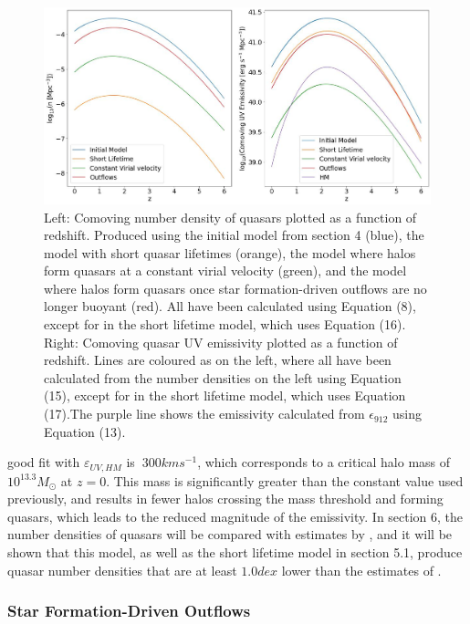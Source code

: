 \documentclass[12pt, twocolumn]{report}%
\begin{document}
\begin{figure}[H]
\centering
\includegraphics[width=\linewidth]{Plot_10.jpeg}
\caption{Left: Comoving number density of quasars plotted as a function of redshift. Produced using the initial model from section 4 (blue), the model with short quasar lifetimes (orange), the model where halos form quasars at a constant virial velocity (green), and the model where halos form quasars once star formation-driven outflows are no longer buoyant (red). All have been calculated using Equation (8), except for in the short lifetime model, which uses Equation (16). Right: Comoving quasar UV emissivity plotted as a function of redshift. Lines are coloured as on the left, where all have been calculated from the number densities on the left using Equation (15), except for in the short lifetime model, which uses Equation (17).The purple line shows the emissivity calculated from $\epsilon_{912}$ using Equation (13).}
\label{fig:10}
\end{figure}
\clearpage
\twocolumngrid


\noindent good fit with $\varepsilon_{UV,HM}$ is $~300kms^{-1}$, which corresponds to a critical halo mass of $10^{13.3}M_\odot$ at $z=0$. This mass is significantly greater than the constant value used previously, and results in fewer halos crossing the mass threshold and forming quasars, which leads to the reduced magnitude of the emissivity. In section 6, the number densities of quasars will be compared with estimates by \cite{Hopkins}, and it will be shown that this model, as well as the short lifetime model in section 5.1, produce quasar number densities that are at least $1.0dex$ lower than the estimates of \citeauthor{Hopkins}.

\subsubsection{Star Formation-Driven Outflows}
\end{document}

